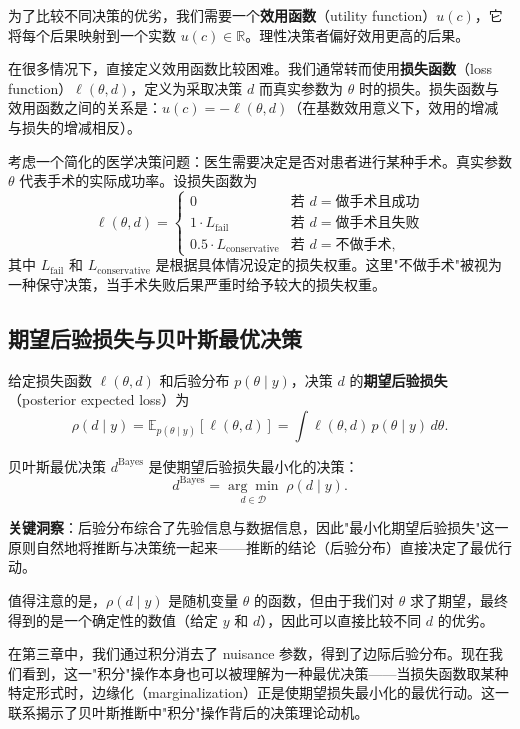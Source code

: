 为了比较不同决策的优劣，我们需要一个\textbf{效用函数}（utility function）$u(c)$，它将每个后果映射到一个实数 $u(c) \in \mathbb{R}$。理性决策者偏好效用更高的后果。

在很多情况下，直接定义效用函数比较困难。我们通常转而使用\textbf{损失函数}（loss function）$\ell(\theta, d)$，定义为采取决策 $d$ 而真实参数为 $\theta$ 时的损失。损失函数与效用函数之间的关系是：$u(c) = - \ell(\theta, d)$（在基数效用意义下，效用的增减与损失的增减相反）。

\begin{Example}[医学治疗决策]\label{ex:medical-decision}
  考虑一个简化的医学决策问题：医生需要决定是否对患者进行某种手术。真实参数 $\theta$ 代表手术的实际成功率。设损失函数为
  \[
  \ell(\theta, d) = \begin{cases}
    0 & \text{若 } d = \text{做手术且成功} \\
    1 \cdot L_{\text{fail}} & \text{若 } d = \text{做手术且失败} \\
    0.5 \cdot L_{\text{conservative}} & \text{若 } d = \text{不做手术},
  \end{cases}
  \]
  其中 $L_{\text{fail}}$ 和 $L_{\text{conservative}}$ 是根据具体情况设定的损失权重。这里"不做手术"被视为一种保守决策，当手术失败后果严重时给予较大的损失权重。
\end{Example}

\subsection{期望后验损失与贝叶斯最优决策}

给定损失函数 $\ell(\theta, d)$ 和后验分布 $p(\theta \mid y)$，决策 $d$ 的\textbf{期望后验损失}（posterior expected loss）为
\[
\rho(d \mid y) = \mathbb{E}_{p(\theta\mid y)}[\ell(\theta, d)] = \int \ell(\theta, d) \, p(\theta \mid y) \, d\theta.
\]

贝叶斯最优决策 $d^{\text{Bayes}}$ 是使期望后验损失最小化的决策：
\[
d^{\text{Bayes}} = \underset{d \in \mathcal{D}}{\arg\min} \; \rho(d \mid y).
\]

\textbf{关键洞察}：后验分布综合了先验信息与数据信息，因此"最小化期望后验损失"这一原则自然地将推断与决策统一起来——推断的结论（后验分布）直接决定了最优行动。

值得注意的是，$\rho(d \mid y)$ 是随机变量 $\theta$ 的函数，但由于我们对 $\theta$ 求了期望，最终得到的是一个确定性的数值（给定 $y$ 和 $d$），因此可以直接比较不同 $d$ 的优劣。

在第三章中，我们通过积分消去了 nuisance 参数，得到了边际后验分布。现在我们看到，这一"积分"操作本身也可以被理解为一种最优决策——当损失函数取某种特定形式时，边缘化（marginalization）正是使期望损失最小化的最优行动。这一联系揭示了贝叶斯推断中"积分"操作背后的决策理论动机。

